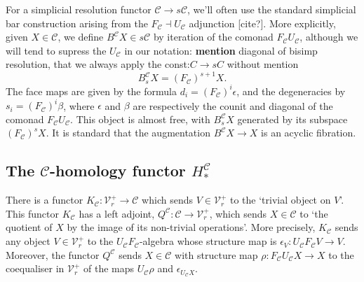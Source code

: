 \documentclass[11pt]{amsart}
\theoremstyle{plain}
\theoremstyle{definition}
\renewcommand{\to}{\longrightarrow}
\newcommand{\calC}{\mathcal{C}}
\newcommand{\calV}{\mathcal{V}}
\theoremstyle{plain}
\newcommand{\vect}[2]{\calV^{#1}_{#2}}
\begin{document}
\begin{Conventions and notation}
For a simplicial resolution functor $\calC\to s\calC$, we'll often use the standard simplicial bar construction arising from the $F_\calC\dashv U_\calC$ adjunction [cite?]. More explicitly, given $X\in\calC$, we define $B^\calC X\in s\calC$ by iteration of the comonad $F_\calC U_\calC$, although we will tend to supress the $U_\calC$ in our notation: \textbf{mention} diagonal of bisimp resolution, that we always apply the const:$C\to sC$ without mention
\[B_s^\calC X=(F_\calC)^{s+1}X.\]
The face maps are given by the formula $d_i=(F_\calC)^i\epsilon$, and the degeneracies by $s_i=(F_\calC)^i\beta$, where $\epsilon$ and $\beta$ are respectively the counit and diagonal of the comonad $F_\calC U_\calC$. This object is almost free, with $B_s^\calC X$ generated by its subspace $(F_{\calC})^sX$. It is standard that the augmentation $B^\calC X\to X$ is an acyclic fibration.


\subsection{The $\calC$-homology functor $H^{\calC}_*$}
There is a functor $K_\calC:\vect{+}{r}\to \calC$ which sends $V\in\vect{+}{r}$ to the `trivial object on $V$'. This functor $K_{\calC}$ has a left adjoint, $Q^{\calC}:\calC\to\vect{+}{r}$, which sends $X\in\calC$ to `the quotient of $X$ by the image of its non-trivial operations'. More precisely, $K_\calC$ sends any object $V\in\vect{+}{r}$ to the $U_{\calC}F_{\calC}$-algebra whose structure map is $\epsilon_V:U_{\calC}F_{\calC}V\to V$. Moreover, the functor $Q^{\calC}$ sends $X\in \calC$ with structure map $\rho:F_\calC U_\calC X\to X$ to the coequaliser in $\vect{+}{r}$ of the maps $U_\calC\rho$ and $\epsilon_{U_\calC X}$.


\end{Conventions and notation}
\end{document}
